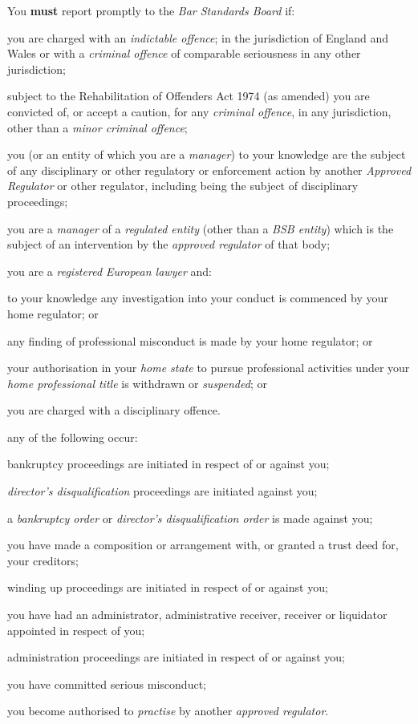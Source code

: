 You \textcolor{myred}{\textbf{must}} report promptly to the \emph{Bar Standards Board} if:
\begin{numlist}\item you are charged with an \emph{indictable offence}; in the
jurisdiction of England and Wales or with a \emph{criminal offence} of
comparable seriousness in any other jurisdiction;
\item subject to the Rehabilitation of Offenders Act 1974 (as amended) you
are convicted of, or accept a caution, for any \emph{criminal offence},
in any jurisdiction, other than a \emph{minor criminal offence};
\item you (or an entity of which you are a \emph{manager}) to your
knowledge are the subject of any disciplinary or other regulatory or
enforcement action by another \emph{Approved Regulator} or other
regulator, including being the subject of disciplinary proceedings;
\item you are a \emph{manager} of a \emph{regulated entity} (other than a
\emph{BSB entity}) which is the subject of an intervention by the
\emph{approved regulator} of that body;
\item you are a \emph{registered European lawyer} and:
\begin{alphlist}\item to your knowledge any investigation into your conduct is commenced by
your home regulator; or
\item any finding of professional misconduct is made by your home
regulator; or
\item your authorisation in your \emph{home state} to pursue professional
activities under your \emph{home professional title} is withdrawn or
\emph{suspended}; or
\item you are charged with a disciplinary offence.\end{alphlist}
\item any of the following occur:
\begin{alphlist}\item bankruptcy proceedings are initiated in respect of or against you;
\item \emph{director's disqualification} proceedings are initiated against
you;
\item a \emph{bankruptcy order} or \emph{director's disqualification order}
is made against you;
\item you have made a composition or arrangement with, or granted a trust
deed for, your creditors;
\item winding up proceedings are initiated in respect of or against you;

\item you have had an administrator, administrative receiver, receiver or
liquidator appointed in respect of you;

\item administration proceedings are initiated in respect of or against
you;\end{alphlist}
\item you have committed serious misconduct;
\item you become authorised to \emph{practise} by another \emph{approved
regulator}.
\end{numlist}



